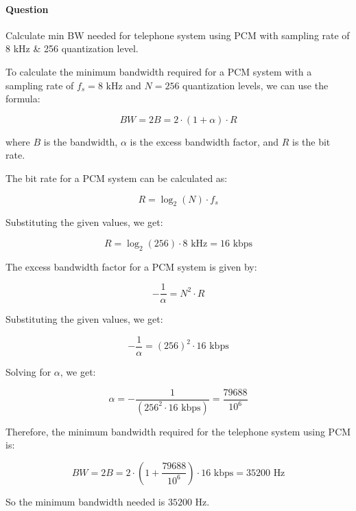 \documentclass[14pt,a4paper]{report}
\newcounter{question}
\newcommand*\question{%
\stepcounter{question}%
\paragraph{Question \thequestion}}
\begin{document}
\question 
{
    Calculate min BW needed for telephone system using PCM with sampling rate of 8 kHz \& 256 quantization level.
}
\begin{answer_box*}
    To calculate the minimum bandwidth required for a PCM system with a sampling rate of $f_s = 8 \text{ kHz}$ and $N = 256$ quantization levels, we can use the formula:

    $$BW = 2B = 2 \cdot (1 + \alpha) \cdot R$$
    
    where $B$ is the bandwidth, $\alpha$ is the excess bandwidth factor, and $R$ is the bit rate.
    
    The bit rate for a PCM system can be calculated as:
    
    $$R = \log_2(N) \cdot f_s$$
    
    Substituting the given values, we get:
    
    $$R = \log_2(256) \cdot 8 \text{ kHz} = 16 \text{ kbps}$$
    
    The excess bandwidth factor for a PCM system is given by:
    
    $$-\frac{1}{\alpha} = N^2 \cdot R$$
    
    Substituting the given values, we get:
    
    $$-\frac{1}{\alpha} = (256)^2 \cdot 16 \text{ kbps}$$
    
    Solving for $\alpha$, we get:
    
    $$\alpha = -\frac{1}{(256^2 \cdot 16 \text{ kbps})} = \frac{79688}{10^6}$$
    
    Therefore, the minimum bandwidth required for the telephone system using PCM is:
    
    $$BW = 2B = 2 \cdot (1 + \frac{79688}{10^6}) \cdot 16 \text{ kbps} = 35200 \text{ Hz}$$
    
    So the minimum bandwidth needed is $35200 \text{ Hz}$.

\end{answer_box*}
\end{document}
